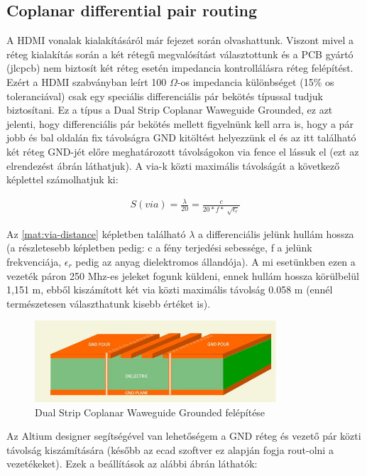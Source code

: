 	\subsection{Coplanar differential pair routing}
	
	A HDMI vonalak kialakításáról már  fejezet során olvashattunk. Viszont mivel a réteg kialakítás során a két rétegű megvalósítást választottunk és a PCB gyártó (jlcpcb) nem biztosít két réteg esetén impedancia kontrollálásra réteg felépítést. Ezért a HDMI szabványban leírt 100 $\Omega$-os impedancia különbséget (15\% os toleranciával) csak egy speciális differenciális pár bekötés típussal tudjuk biztosítani. Ez a típus a Dual Strip Coplanar Waweguide Grounded, ez azt jelenti, hogy differenciális pár bekötés mellett figyelnünk kell arra is, hogy a pár jobb és bal oldalán fix távolságra GND kitöltést helyezzünk el és az itt található két réteg GND-jét előre meghatározott távolságokon via fence el lássuk el (ezt az elrendezést  ábrán láthatjuk). A via-k közti maximális távolságát a következő képlettel számolhatjuk ki:
	
	\begin{align}
		\label{mat:via-distance}	
		S(via) = \frac{\lambda}{20} = \frac{c}{20 * f * \sqrt[]{\epsilon_r}}
	\end{align}   
	
	Az \ref{mat:via-distance} képletben található $\lambda$ a differenciális jelünk hullám hossza (a részletesebb képletben pedig: c a fény terjedési sebessége, f a jelünk frekvenciája, $\epsilon_r$ pedig az anyag dielektromos állandója). A mi esetünkben ezen a vezeték páron 250 Mhz-es jeleket fogunk küldeni, ennek hullám hossza körülbelül 1,151 m, ebből kiszámított két via közti maximális távolság 0.058 m (ennél természetesen választhatunk kisebb értéket is).
	
	\begin{figure}[H]
		\centering
		\includegraphics[width=90mm, keepaspectratio]{figures/coplanar}
		\caption{Dual Strip Coplanar Waweguide Grounded felépítése} 
		\label{fig:coplanar}
	\end{figure}
	
	Az Altium designer segítségével van lehetőségem a GND réteg és vezető pár közti távolság kiszámítására (később az ecad szoftver ez alapján fogja rout-olni a vezetékeket). Ezek a beállítások az alábbi ábrán láthatók:      
	
